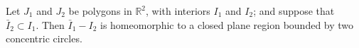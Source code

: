 Let $J_1$ and $J_2$ be polygons in $\mathbb{R}^2$, with interiors $I_1$ and $I_2$; and suppose that $\bar{I}_2 \subset I_1$. Then $\bar{I}_1 - I_2$ is homeomorphic to a closed plane region bounded by two concentric circles.
